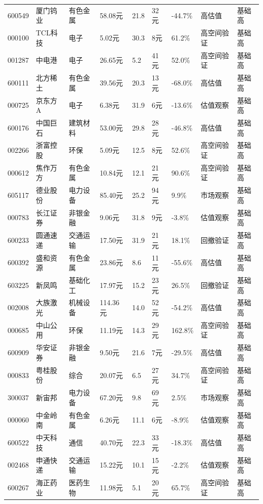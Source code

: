 \begin{longtable}{L{1.0cm}L{1.55cm}L{1.4cm}R{1.0cm}R{1.0cm}R{1.0cm}R{1.05cm}L{3.6cm}L{0.9cm}}
600549 & 厦门钨业 & 有色金属 & 58.08元 & 21.8 & 32元 & -44.7\% & 高估值 & 基础高 \\
000100 & TCL科技 & 电子 & 5.02元 & 30.3 & 8元 & 61.2\% & 高空间验证 & 基础高 \\
001287 & 中电港 & 电子 & 26.65元 & 5.2 & 41元 & 52.0\% & 高空间验证 & 基础高 \\
600111 & 北方稀土 & 有色金属 & 39.56元 & 20.3 & 13元 & -68.0\% & 高估值 & 基础高 \\
000725 & 京东方A & 电子 & 6.38元 & 31.9 & 6元 & -13.6\% & 估值观察 & 基础高 \\
600176 & 中国巨石 & 建筑材料 & 53.00元 & 29.8 & 28元 & -46.8\% & 高估值 & 基础高 \\
002266 & 浙富控股 & 环保 & 5.09元 & 12.5 & 8元 & 52.6\% & 高空间验证 & 基础高 \\
000612 & 焦作万方 & 有色金属 & 10.84元 & 12.1 & 21元 & 90.6\% & 高空间验证 & 基础高 \\
605117 & 德业股份 & 电力设备 & 85.40元 & 25.2 & 94元 & 9.9\% & 市场观察 & 基础高 \\
000783 & 长江证券 & 非银金融 & 9.06元 & 31.8 & 9元 & -3.8\% & 估值观察 & 基础高 \\
600233 & 圆通速递 & 交通运输 & 17.50元 & 31.9 & 21元 & 18.1\% & 回撤验证 & 基础高 \\
600392 & 盛和资源 & 有色金属 & 23.86元 & 8.6 & 11元 & -55.6\% & 高估值 & 基础高 \\
603225 & 新凤鸣 & 基础化工 & 17.97元 & 15.2 & 23元 & 26.5\% & 回撤验证 & 基础高 \\
002008 & 大族激光 & 机械设备 & 114.36元 & 14.0 & 52元 & -54.2\% & 高估值 & 基础高 \\
000685 & 中山公用 & 环保 & 11.19元 & 14.3 & 29元 & 162.8\% & 高空间验证 & 基础高 \\
600909 & 华安证券 & 非银金融 & 9.50元 & 21.6 & 7元 & -29.5\% & 高估值 & 基础高 \\
000833 & 粤桂股份 & 综合 & 20.07元 & 6.5 & 27元 & 34.7\% & 高空间验证 & 基础高 \\
300037 & 新宙邦 & 电力设备 & 67.20元 & 9.8 & 69元 & 2.5\% & 市场观察 & 基础高 \\
000060 & 中金岭南 & 有色金属 & 6.26元 & 11.1 & 6元 & -8.9\% & 估值观察 & 基础高 \\
600522 & 中天科技 & 通信 & 40.70元 & 22.3 & 33元 & -18.3\% & 高估值 & 基础高 \\
002468 & 申通快递 & 交通运输 & 15.22元 & 10.1 & 15元 & -2.2\% & 估值观察 & 基础高 \\
600267 & 海正药业 & 医药生物 & 11.98元 & 5.1 & 20元 & 65.7\% & 高空间验证 & 基础高 \\

\end{longtable}

